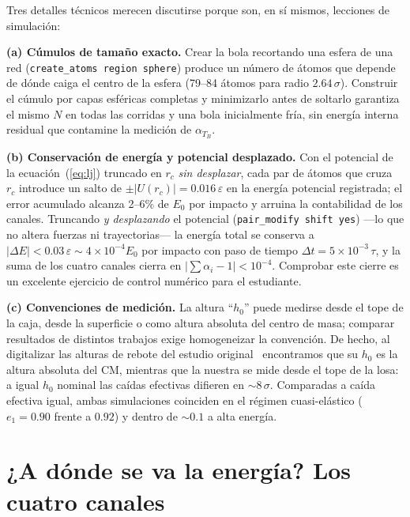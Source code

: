 \documentclass[10pt,a4paper,twocolumn]{article}
\newcommand{\eps}{\varepsilon}
\begin{document}
Tres detalles técnicos merecen discutirse porque son, en sí mismos,
lecciones de simulación:

\textbf{(a) Cúmulos de tamaño exacto.} Crear la bola recortando una esfera
de una red (\texttt{create\_atoms region sphere}) produce un número de
átomos que depende de dónde caiga el centro de la esfera (79--84 átomos
para radio $2.64\,\sigma$). Construir el cúmulo por capas esféricas
completas y minimizarlo antes de soltarlo garantiza el mismo $N$ en todas
las corridas y una bola inicialmente fría, sin energía interna residual
que contamine la medición de $\alpha_{T_B}$.

\textbf{(b) Conservación de energía y potencial desplazado.} Con el
potencial de la ecuación~(\ref{eq:lj}) truncado en $r_c$ \emph{sin
desplazar}, cada par de átomos que cruza $r_c$ introduce un salto de
$\pm|U(r_c)|=0.016\,\eps$ en la energía potencial registrada; el error
acumulado alcanza 2--6\% de $E_0$ por impacto y arruina la contabilidad de
los canales. Truncando \emph{y desplazando} el potencial
(\texttt{pair\_modify shift yes}) ---lo que no altera fuerzas ni
trayectorias--- la energía total se conserva a
$|\Delta E|<0.03\,\eps\sim4\times10^{-4}E_0$ por impacto con paso de
tiempo $\Delta t=5\times10^{-3}\,\tau$, y la suma de los cuatro canales
cierra en $|\sum\alpha_i-1|<10^{-4}$. Comprobar este cierre es un
excelente ejercicio de control numérico para el estudiante.

\textbf{(c) Convenciones de medición.} La altura ``$h_0$'' puede medirse
desde el tope de la caja, desde la superficie o como altura absoluta del
centro de masa; comparar resultados de distintos trabajos exige
homogeneizar la convención. De hecho, al digitalizar las alturas de
rebote del estudio original~\cite{Gutierrez2012} encontramos que su $h_0$
es la altura absoluta del CM, mientras que la nuestra se mide desde el
tope de la losa: a igual $h_0$ nominal las caídas efectivas difieren en
$\sim8\,\sigma$. Comparadas a caída efectiva igual, ambas simulaciones
coinciden en el régimen cuasi-elástico ($e_1=0.90$ frente a $0.92$) y
dentro de $\sim0.1$ a alta energía.

\section{¿A dónde se va la energía? Los cuatro canales}
\label{sec:canales}
\end{document}
